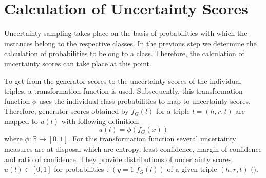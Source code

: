 \section{Calculation of Uncertainty Scores}
\label{sec:calculation_of_uncertainty_scores}
%
Uncertainty sampling takes place on the basis of probabilities with which the instances belong to the respective classes.
In the previous step we determine the calculation of probabilities to belong to a class.
Therefore, the calculation of uncertainty scores can take place at this point.

To get from the generator scores to the uncertainty scores of the individual triples, a transformation function is used.
Subsequently, this transformation function $\phi$ uses the individual class probabilities to map to uncertainty scores.
Therefore, generator scores obtained by $f_G(l)$ for a triple $l = (h,r,t)$ are  mapped to $u(l)$ with following definition.
\begin{equation} \label{eqn:uncertainty_function}
    u(l) = \phi(f_G(x))
\end{equation}
where $\phi: \mathbb{R} \rightarrow [0,1]$.
For this transformation function several uncertainty measures are at disposal which are entropy, least confidence, margin of confidence and ratio of confidence.
They provide distributions of uncertainty scores $u(l) \in [0, 1]$ for probabilities $\mathbb{P}(y = 1 | f_G(l))$ of a given triple $(h, r, t)$ ().
